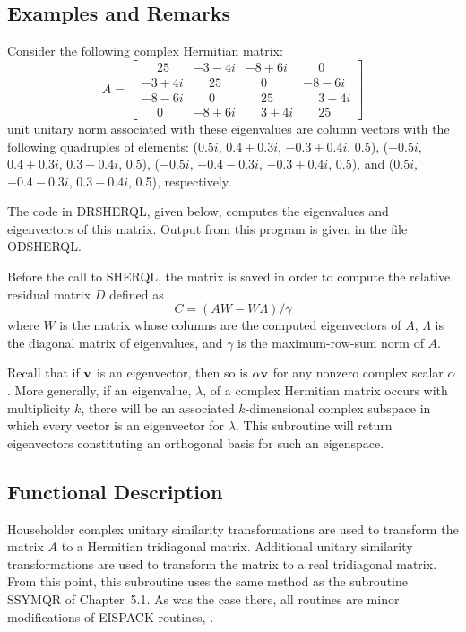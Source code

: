 \documentclass[twoside]{MATH77}
\begin{document}
\subsection{Examples and Remarks}

Consider the following complex Hermitian matrix:
\begin{equation*}
A=\left[
\begin{array}{cccc}
\phantom{-}25 & -3-4i & -8+6i & \phantom{-}0 \\
-3+4i & \phantom{-}25 & \phantom{-}0 & -8-6i \\
-8-6i & \phantom{-}0 & \phantom{-}25 & \phantom{-}3-4i \\
\phantom{-}0 & -8+6i & \phantom{-}3+4i & \phantom{-}25
\end{array}
\right]
\end{equation*}
unit unitary norm associated with these eigenvalues are column
vectors with the following quadruples of elements:
($0.5i$, $0.4+0.3i$, $-0.3+0.4i$, 0.5),
($-0.5i$, $0.4+0.3i$, $0.3-0.4i$, 0.5),
($-0.5i$, $-0.4-0.3i$, $-0.3+0.4i$, 0.5),  and
($0.5i$, $-0.4-0.3i$, $0.3-0.4i$, 0.5), respectively.

The code in DRSHERQL, given below, computes the eigenvalues and eigenvectors
of this matrix. Output from this program is given in the file ODSHERQL.

Before the call to SHERQL, the matrix is saved in order to compute the
relative residual matrix $D$ defined as%
\begin{equation*}
C=\left( AW-W\Lambda \right) /\gamma
\end{equation*}
where $W$ is the matrix whose columns are the computed eigenvectors
of $A$, $\Lambda $ is the diagonal matrix of eigenvalues, and $\gamma $ is the
maximum-row-sum norm of $A$.

Recall that if ${\bf v}$ is an eigenvector, then so is $\alpha{\bf
v}$ for any nonzero complex scalar $\alpha$.  More generally, if an
eigenvalue, $\lambda$, of a complex Hermitian matrix occurs with
multiplicity $k$, there will be an associated  $k$-dimensional
complex subspace in which every vector is an eigenvector for
$\lambda$.  This subroutine will return eigenvectors constituting an
orthogonal basis for such an eigenspace.

\subsection{Functional Description}

Householder complex unitary similarity transformations are used to transform
the matrix $A$ to a Hermitian tridiagonal matrix. Additional unitary
similarity transformations are used to transform the matrix to a real
tridiagonal matrix. From this point, this subroutine uses the same method as
the subroutine SSYMQR of Chapter~5.1. As was the case there, all routines
are minor modifications of EISPACK routines, \cite{Smith:1974:MER}.
\end{document}
